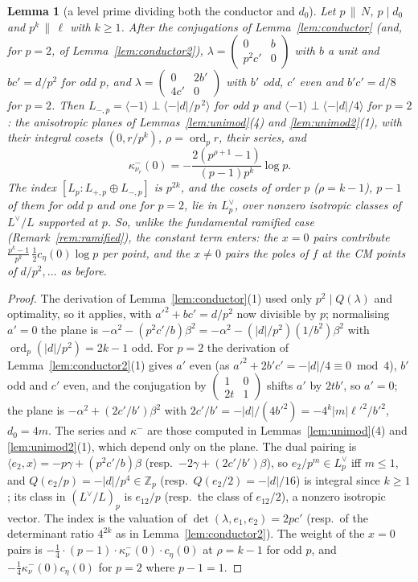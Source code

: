 \documentclass[11pt,reqno]{amsart}
\theoremstyle{plain}
\newtheorem{lemma}[theorem]{Lemma}
\theoremstyle{definition}
\DeclareMathOperator{\ord}{ord}
\newcommand{\Z}{\mathbb{Z}}
\newcommand{\Ldual}{L^{\vee}}
\begin{document}
\begin{lemma}[a level prime dividing both the conductor and $d_0$]\label{lem:ramlevel}
Let $p\,\|\,N$, $p\mid d_0$ and $p^k\,\|\,\ell$ with $k\ge1$. After the conjugations of
Lemma~\ref{lem:conductor} (and, for $p=2$, of Lemma~\ref{lem:conductor2}), $\lambda=\begin{pmatrix}0&b\\
p^2c'&0\end{pmatrix}$ with $b$ a unit and $bc'=d/p^2$ for odd $p$, and $\lambda=\begin{pmatrix}0&2b'\\4c'
&0\end{pmatrix}$ with $b'$ odd, $c'$ even and $b'c'=d/8$ for $p=2$. Then $L_{-,p}=\langle-1\rangle\perp
\langle-\lvert d\rvert/p^{\,2}\rangle$ for odd $p$ and $\langle-1\rangle\perp\langle-\lvert d\rvert/4\rangle$
for $p=2$: the anisotropic planes of Lemmas~\ref{lem:unimod}(4) and \ref{lem:unimod2}(1), with their
integral cosets $(0,r/p^k)$, $\rho=\ord_pr$, their series, and
\[
  \kappa^-_{\nu_r}(0)=-\frac{2(p^{\rho+1}-1)}{(p-1)p^k}\log p .
\]
The index $[L_p:L_{+,p}\oplus L_{-,p}]$ is $p^{2k}$, and the cosets of order $p$ ($\rho=k-1$), $p-1$
of them for odd $p$ and one for $p=2$, lie in $L_p^\vee$, over nonzero isotropic classes of
$\Ldual/L$ supported at $p$. So, unlike the fundamental ramified case (Remark~\ref{rem:ramified}),
the constant term enters: the $x=0$ pairs contribute $\tfrac{p^k-1}{p^k}\,\tfrac12c_\eta(0)\log p$ per
point, and the $x\ne0$ pairs the poles of $f$ at the CM points of $d/p^2,\dots$ as before.
\end{lemma}
\begin{proof}
The derivation of Lemma~\ref{lem:conductor}(1) used only $p^2\mid Q(\lambda)$ and optimality, so it
applies, with $a'^2+bc'=d/p^2$ now divisible by $p$; normalising $a'=0$ the plane is
$-\alpha^2-(p^2c'/b)\beta^2=-\alpha^2-(\lvert d\rvert/p^2)(1/b^2)\beta^2$ with $\ord_p(\lvert d\rvert/p^2)
=2k-1$ odd. For $p=2$ the derivation of Lemma~\ref{lem:conductor2}(1) gives $a'$ even (as $a'^2+2b'c'
=-\lvert d\rvert/4\equiv0\bmod4$), $b'$ odd and $c'$ even, and the conjugation by $\begin{pmatrix}1&0\\
2t&1\end{pmatrix}$ shifts $a'$ by $2tb'$, so $a'=0$; the plane is $-\alpha^2+(2c'/b')\beta^2$ with
$2c'/b'=-\lvert d\rvert/(4b'^2)=-4^k\lvert m\rvert \ell'^2/b'^2$, $d_0=4m$. The series and $\kappa^-$ are
those computed in Lemmas~\ref{lem:unimod}(4) and \ref{lem:unimod2}(1), which depend only on the plane.
The dual pairing is $\langle e_2,x\rangle=-p\gamma+(p^2c'/b)\beta$ (resp.\ $-2\gamma+(2c'/b')\beta$),
so $e_2/p^m\in L_p^\vee$ iff $m\le1$, and $Q(e_2/p)=-\lvert d\rvert/p^4\in\Z_p$ (resp.\ $Q(e_2/2)=
-\lvert d\rvert/16$) is integral since $k\ge1$; its class in $(\Ldual/L)_p$ is $e_{12}/p$ (resp.\ the
class of $e_{12}/2$), a nonzero isotropic vector. The index is the valuation of
$\det(\lambda,e_1,e_2)=2pc'$ (resp.\ of the determinant ratio $4^{2k}$ as in Lemma~\ref{lem:conductor2}).
The weight of the $x=0$ pairs is $-\tfrac14\cdot(p-1)\cdot\kappa^-_{\nu}(0)\cdot c_\eta(0)$ at $\rho=k-1$
for odd $p$, and $-\tfrac14\kappa^-_\nu(0)c_\eta(0)$ for $p=2$ where $p-1=1$.
\end{proof}
\end{document}
